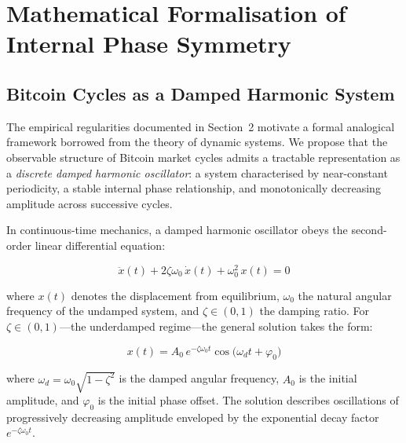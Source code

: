 

\section{Mathematical Formalisation of Internal Phase Symmetry}

\subsection{Bitcoin Cycles as a Damped Harmonic System}

The empirical regularities documented in Section~2 motivate a formal analogical
framework borrowed from the theory of dynamic systems. We propose that the
observable structure of Bitcoin market cycles admits a tractable representation
as a \textit{discrete damped harmonic oscillator}: a system characterised by
near-constant periodicity, a stable internal phase relationship, and
monotonically decreasing amplitude across successive cycles.

In continuous-time mechanics, a damped harmonic oscillator obeys the
second-order linear differential equation:

\begin{equation}
  \ddot{x}(t) + 2\zeta\omega_0\,\dot{x}(t) + \omega_0^2\,x(t) = 0
  \label{eq:dho}
\end{equation}

where $x(t)$ denotes the displacement from equilibrium, $\omega_0$ the
natural angular frequency of the undamped system, and $\zeta \in (0,1)$ the
damping ratio. For $\zeta \in (0,1)$---the underdamped regime---the general
solution takes the form:

\begin{equation}
  x(t) = A_0\, e^{-\zeta\omega_0 t}
           \cos\!\bigl(\omega_d t + \varphi_0\bigr)
  \label{eq:dho_solution}
\end{equation}

where $\omega_d = \omega_0\sqrt{1 - \zeta^2}$ is the damped angular frequency,
$A_0$ is the initial amplitude, and $\varphi_0$ is the initial phase offset.
The solution describes oscillations of progressively decreasing amplitude
enveloped by the exponential decay factor $e^{-\zeta\omega_0 t}$.

